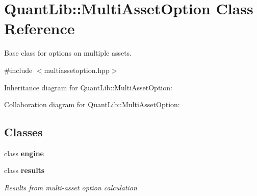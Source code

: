 \section{Quant\+Lib\+:\+:Multi\+Asset\+Option Class Reference}
\label{class_quant_lib_1_1_multi_asset_option}


Base class for options on multiple assets.  




{\ttfamily \#include $<$multiassetoption.\+hpp$>$}



Inheritance diagram for Quant\+Lib\+:\+:Multi\+Asset\+Option\+:


Collaboration diagram for Quant\+Lib\+:\+:Multi\+Asset\+Option\+:
\subsection*{Classes}
\begin{DoxyCompactItemize}
\item 
class {\bf engine}
\item 
class {\bf results}
\begin{DoxyCompactList}\small\item\em Results from multi-\/asset option calculation \end{DoxyCompactList}\end{DoxyCompactItemize}
